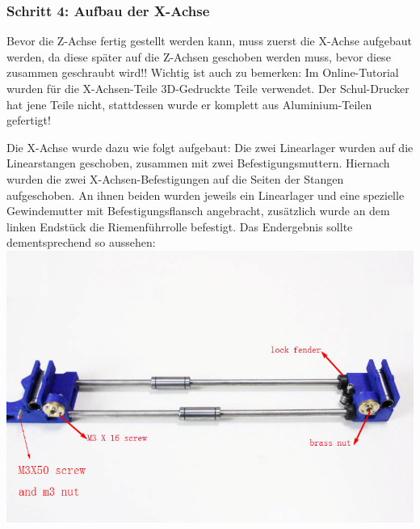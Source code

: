 \subsubsection{Schritt 4: Aufbau der X-Achse}
Bevor die Z-Achse fertig gestellt werden kann, muss zuerst die X-Achse aufgebaut werden, da diese später auf die Z-Achsen geschoben werden muss, bevor diese zusammen geschraubt wird!! 
Wichtig ist auch zu bemerken: Im Online-Tutorial wurden für die X-Achsen-Teile 3D-Gedruckte Teile verwendet. Der Schul-Drucker hat jene Teile nicht, stattdessen wurde er komplett aus Aluminium-Teilen gefertigt!

Die X-Achse wurde dazu wie folgt aufgebaut:
Die zwei Linearlager wurden auf die Linearstangen geschoben, zusammen mit zwei Befestigungsmuttern. Hiernach wurden die zwei X-Achsen-Befestigungen auf die Seiten der Stangen aufgeschoben. An ihnen beiden wurden jeweils ein Linearlager und eine spezielle Gewindemutter mit Befestigungsflansch angebracht, zusätzlich wurde an dem linken Endstück die Riemenführrolle befestigt.
Das Endergebnis sollte dementsprechend so aussehen:\\
\includegraphics[clip=true, trim=0 0 0 100, width=\textwidth]{Bilder/X_Assembly_1.jpg}

